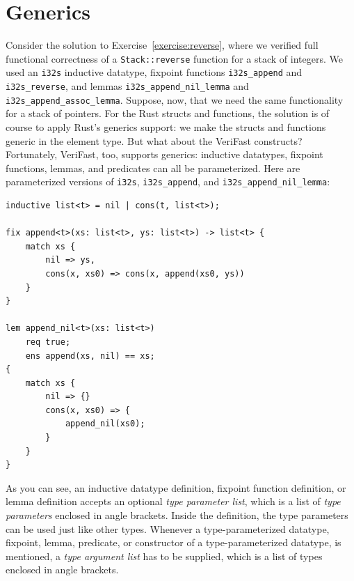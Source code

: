 \documentclass{article}
\begin{document}
\section{Generics}\label{section:generics}

Consider the solution to Exercise~\ref{exercise:reverse}, where
we verified full functional correctness of a
\lstinline!Stack::reverse! function for a stack of integers. We
used an \lstinline!i32s! inductive datatype, fixpoint functions
\lstinline!i32s_append! and \lstinline!i32s_reverse!, and lemmas
\lstinline!i32s_append_nil_lemma! and \lstinline!i32s_append_assoc_lemma!. Suppose,
now, that we need the same functionality for a stack of
pointers. For the Rust structs and functions, the solution is of course to apply
Rust's generics support: we make the structs and functions generic in the element type.
But what about the VeriFast constructs? Fortunately, VeriFast, too,
supports generics: inductive datatypes, fixpoint
functions, lemmas, and predicates can all be parameterized.
Here are parameterized versions of \lstinline!i32s!,
\lstinline!i32s_append!, and \lstinline!i32s_append_nil_lemma!:
\begin{lstlisting}
inductive list<t> = nil | cons(t, list<t>);

fix append<t>(xs: list<t>, ys: list<t>) -> list<t> {
    match xs {
        nil => ys,
        cons(x, xs0) => cons(x, append(xs0, ys))
    }
}

lem append_nil<t>(xs: list<t>)
    req true;
    ens append(xs, nil) == xs;
{
    match xs {
        nil => {}
        cons(x, xs0) => {
            append_nil(xs0);
        }
    }
}
\end{lstlisting}
As you can see, an inductive datatype definition, fixpoint
function definition, or lemma definition accepts an optional
\emph{type parameter list}, which is a list of \emph{type
parameters} enclosed in angle brackets. Inside the definition,
the type parameters can be used just like other types. Whenever
a type-parameterized datatype, fixpoint, lemma, predicate, or
constructor of a type-parameterized datatype, is mentioned, a
\emph{type argument list} has to be supplied, which is a list
of types enclosed in angle brackets.
\end{document}
